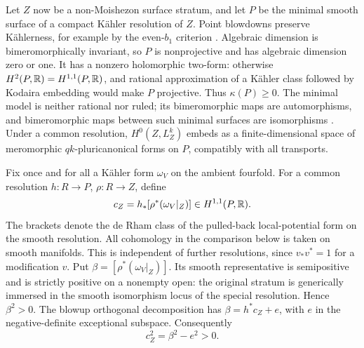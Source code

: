 Let \(Z\) now be a non-Moishezon surface stratum, and let \(P\) be the
minimal smooth surface of a compact K\"ahler resolution of \(Z\).
Point blowdowns preserve K\"ahlerness, for example by the even-\(b_1\)
criterion \cite[Theorem~11]{Buchdahl1999}.  Algebraic dimension is
bimeromorphically invariant, so \(P\) is nonprojective and has algebraic
dimension zero or one.  It has a nonzero holomorphic two-form: otherwise
\(H^2(P,\mathbb R)=H^{1,1}(P,\mathbb R)\), and rational approximation of a K\"ahler
class followed by Kodaira embedding would make \(P\) projective.  Thus
\(\kappa(P)\geq0\).  The minimal model is neither rational nor ruled;
its bimeromorphic maps are automorphisms, and bimeromorphic maps between
such minimal surfaces are isomorphisms
\cite[Proposition~3.5]{ProkhorovShramov2017}.  Under a common resolution,
\(H^0(Z,L_Z^k)\) embeds as a finite-dimensional space of meromorphic
\(qk\)-pluricanonical forms on \(P\), compatibly with all transports.

Fix once and for all a K\"ahler form \(\omega_V\) on the ambient fourfold.
For a common resolution \(h:R\to P\), \(\rho:R\to Z\), define
\begin{equation}\label{eq:surface-class}
 c_Z=h_*[\rho^*(\omega_V|_Z)]\in H^{1,1}(P,\mathbb R).
\end{equation}
The brackets denote the de Rham class of the pulled-back local-potential
form on the smooth resolution.  All cohomology in the comparison below
is taken on smooth manifolds.
This is independent of further resolutions, since \(v_*v^*=1\) for a
modification \(v\).  Put \(\beta=[\rho^*(\omega_V|_Z)]\).  Its smooth
representative is semipositive and is strictly positive on a nonempty
open: the original stratum is generically immersed in the smooth
isomorphism locus of the special resolution.  Hence \(\beta^2>0\).
The blowup orthogonal decomposition has
\(\beta=h^*c_Z+e\), with \(e\) in the negative-definite exceptional
subspace.  Consequently
\begin{equation}\label{eq:surface-class-positive}
 c_Z^2=\beta^2-e^2>0.
\end{equation}


